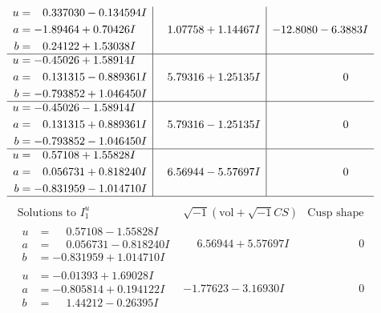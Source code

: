 \documentclass[1p]{elsarticle_modified}
\theoremstyle{definition}
\newcommand{\I}{\sqrt{-1}}
\begin{document}
$$\begin{array}{c|c|c}
\begin{aligned}
u &= \phantom{-}0.337030 - 0.134594 I \\
a &= -1.89464 + 0.70426 I \\
b &= \phantom{-}0.24122 + 1.53038 I\end{aligned}
 & \phantom{-}1.07758 + 1.14467 I & -12.8080 - 6.3883 I \\ \hline\begin{aligned}
u &= -0.45026 + 1.58914 I \\
a &= \phantom{-}0.131315 - 0.889361 I \\
b &= -0.793852 + 1.046450 I\end{aligned}
 & \phantom{-}5.79316 + 1.25135 I & \phantom{-0.000000 } 0 \\ \hline\begin{aligned}
u &= -0.45026 - 1.58914 I \\
a &= \phantom{-}0.131315 + 0.889361 I \\
b &= -0.793852 - 1.046450 I\end{aligned}
 & \phantom{-}5.79316 - 1.25135 I & \phantom{-0.000000 } 0 \\ \hline\begin{aligned}
u &= \phantom{-}0.57108 + 1.55828 I \\
a &= \phantom{-}0.056731 + 0.818240 I \\
b &= -0.831959 - 1.014710 I\end{aligned}
 & \phantom{-}6.56944 - 5.57697 I & \phantom{-0.000000 } 0\\
 \hline 
 \end{array}$$\newpage$$\begin{array}{c|c|c}  
\text{Solutions to }I^u_{1}& \I (\text{vol} + \sqrt{-1}CS) & \text{Cusp shape}\\
 \hline 
\begin{aligned}
u &= \phantom{-}0.57108 - 1.55828 I \\
a &= \phantom{-}0.056731 - 0.818240 I \\
b &= -0.831959 + 1.014710 I\end{aligned}
 & \phantom{-}6.56944 + 5.57697 I & \phantom{-0.000000 } 0 \\ \hline\begin{aligned}
u &= -0.01393 + 1.69028 I \\
a &= -0.805814 + 0.194122 I \\
b &= \phantom{-}1.44212 - 0.26395 I\end{aligned}
 & -1.77623 - 3.16930 I & \phantom{-0.000000 } 0 \\ \hline\begin{aligned}

\end{aligned}
\end{array}$$
\end{document}
